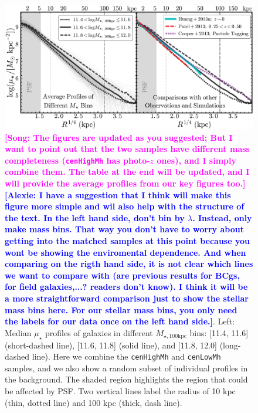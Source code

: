 \documentclass{emulateapj}
\def\rbcg{\texttt{cenHighMh}}
\def\nbcg{\texttt{cenLowMh}}
\def\mtot{{$M_{\star,100\mathrm{kpc}}$}}
\def\mden{{$\mu_{\star}$}}
\newcommand{\song}[1]{\textcolor{magenta}{\textbf{[Song: #1]}}}
\newcommand{\alexie}[1]{\textcolor{blue}{\textbf{[Alexie: #1]}}}
\begin{document}
\begin{CJK*}{UTF8}{gbsn}

  \begin{figure}[bt!]
      \centering 
      \includegraphics[width=\textwidth]{fig/average_mass_profiles_fsps1_A}
      \caption{
      	\song{The figures are updated as you suggested; But I want to point out that
        the two samples have different mass completeness (\rbcg{} has photo-$z$ ones), and 
        I simply combine them.  The table at the end will be updated, and I will provide 
        the average profiles from our key figures too.}
      	\alexie{I have a suggestion that I think will make this figure more simple and wil also help with the structure of the text. In the left hand side, don't bin by $\lambda$. Instead, only make mass bins. That way you don't have to worry about getting into the matched samples at this point because you wont be showing the enviromental dependence. And when comparing on the rigth hand side, it is not clear which lines we want to compare with (are previous results for BCgs, for field galaxies,...? readers don't know). I think it will be a more straightforward comparison just to show the stellar mass bins here. For our stellar mass bins, you only need the labels for our data once on the left hand side.}. 
      	Left: Median \mden{} profiles of galaxies in different \mtot{} bins:
      	[11.4, 11.6] (short-dashed line), [11.6, 11.8] (solid line), and 
      	[11.8, 12.0] (long-dashed line). 
      	Here we combine the \rbcg{} and \nbcg{} samples, and we also show a random subset 
      	of individual profiles in the background.
      	The shaded region highlights the region that could be affected by PSF.
        Two vertical lines label the radius of 10 kpc (thin, dotted line) and
        100 kpc (thick, dash line). ~~~ 
}
\end{figure}
\end{CJK*}
\end{document}
